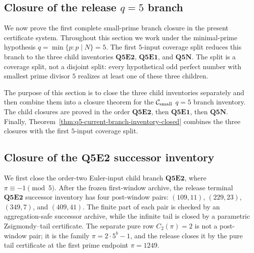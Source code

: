\subsection{Closure of the release \texorpdfstring{\(q=5\)}{q=5} branch}
\label{sec:q5-branch-closure}

We now prove the first complete small-prime branch closure in the present
certificate system.  Throughout this section we work under the minimal-prime
hypothesis \(q=\min\{p:p\mid N\}=5\).
The first \(5\)-input coverage split reduces this branch to the three child
inventories \(\mathbf{Q5E2}\), \(\mathbf{Q5E1}\), and \(\mathbf{Q5N}\).
The split is a coverage split, not a disjoint split: every hypothetical odd
perfect number with smallest prime divisor \(5\) realizes at least one of these
three children.

The purpose of this section is to close the three child inventories separately
and then combine them into a closure theorem for the \(\mathcal C_{\mathrm{small}}\) \(q=5\)
branch inventory.  The child closures are proved in the order
\(\mathbf{Q5E2}\), then \(\mathbf{Q5E1}\), then \(\mathbf{Q5N}\).
Finally, Theorem~\ref{thm:q5-current-branch-inventory-closed} combines the three
closures with the first \(5\)-input coverage split.


\subsection{Closure of the \(\mathbf{Q5E2}\) successor inventory}

We first close the order-two Euler-input child branch \(\mathbf{Q5E2}\), where
\(\pi\equiv-1\pmod5\).
After the frozen first-window archive, the release terminal
\(\mathbf{Q5E2}\) successor inventory has four post-window pairs:
\((109,11)\), \((229,23)\), \((349,7)\), and \((409,41)\).
The finite part of each pair is checked by an aggregation-safe successor archive, while the infinite tail is closed by a parametric Zsigmondy--tail certificate.
The separate pure row \(C_2(\pi)=2\) is not a post-window pair; it is the family
\(\pi=2\cdot5^b-1\), and the release closes it by the pure tail certificate at
the first prime endpoint \(\pi=1249\).

